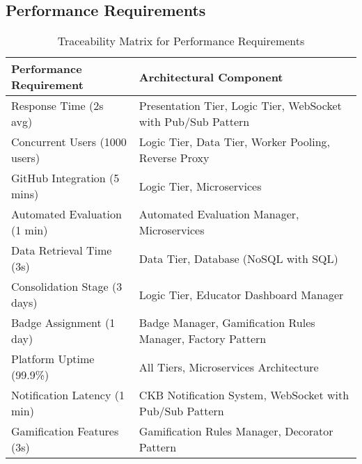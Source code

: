\subsection{Performance Requirements}
\label{subsec:performance_requirements}%
\begin{table}[h]
    \centering
    \begin{tabular}{|l|l|}
    \hline
    \textbf{Performance Requirement} & \textbf{Architectural Component} \\
    \hline
    Response Time (2s avg) & Presentation Tier, Logic Tier, WebSocket with Pub/Sub Pattern \\
    \hline
    Concurrent Users (1000 users) & Logic Tier, Data Tier, Worker Pooling, Reverse Proxy \\
    \hline
    GitHub Integration (5 mins) & Logic Tier, Microservices \\
    \hline
    Automated Evaluation (1 min) & Automated Evaluation Manager, Microservices \\
    \hline
    Data Retrieval Time (3s) & Data Tier, Database (NoSQL with SQL) \\
    \hline
    Consolidation Stage (3 days) & Logic Tier, Educator Dashboard Manager \\
    \hline
    Badge Assignment (1 day) & Badge Manager, Gamification Rules Manager, Factory Pattern \\
    \hline
    Platform Uptime (99.9\%) & All Tiers, Microservices Architecture \\
    \hline
    Notification Latency (1 min) & CKB Notification System, WebSocket with Pub/Sub Pattern \\
    \hline
    Gamification Features (3s) & Gamification Rules Manager, Decorator Pattern \\
    \hline
    \end{tabular}
    \caption{Traceability Matrix for Performance Requirements}
    \label{table:performance-req-traceability}
    \end{table}
    
